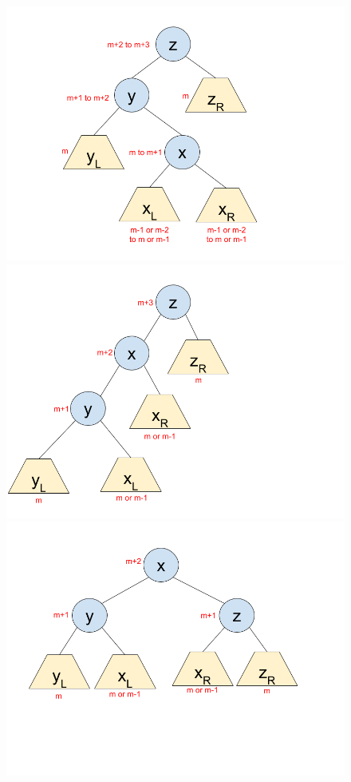\documentclass[12pt]{article}
\begin{document}
\begin{enumerate}
  \begin{figure}
  \centering
    \includegraphics[trim=50 0 150 40, clip,scale=0.33]{pics/avl_insert_lr1}\\
    \includegraphics[trim=0 0 250 40, clip,scale=0.33]{pics/avl_insert_lr2}
    \includegraphics[trim=50 50 50 40, clip,scale=0.33]{pics/avl_insert_lr3}
  \end{figure}


\end{enumerate}
\end{document}
